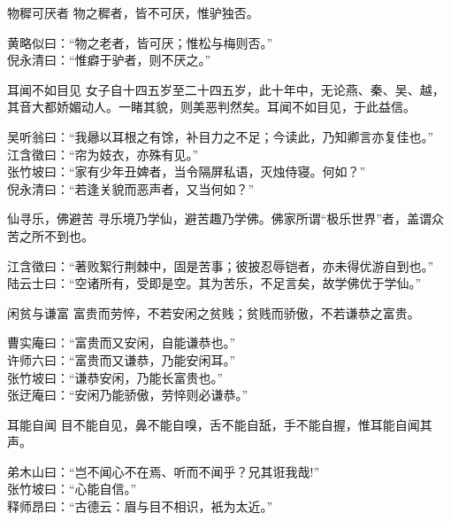 \begin{yulu}{物穉可厌者}
物之穉者，皆不可厌，惟驴独否。
\begin{comments}
黄略似曰：“物之老者，皆可厌；惟松与梅则否。” \\
倪永清曰：“惟癖于驴者，则不厌之。”
\end{comments}
\end{yulu}

\begin{yulu}{耳闻不如目见}
女子自十四五岁至二十四五岁，此十年中，无论燕、秦、吴、越，其音大都娇媚动人。一睹其貌，则美恶判然矣。耳闻不如目见，于此益信。
\begin{comments}
吴听翁曰：“我曏以耳根之有馀，补目力之不足；今读此，乃知卿言亦复佳也。” \\
江含徵曰：“帘为妓衣，亦殊有见。” \\
张竹坡曰：“家有少年丑婢者，当令隔屏私语，灭烛侍寝。何如？” \\
倪永清曰：“若逢关貌而恶声者，又当何如？”
\end{comments}
\end{yulu}

\begin{yulu}{仙寻乐，佛避苦}
寻乐境乃学仙，避苦趣乃学佛。佛家所谓“极乐世界”者，盖谓众苦之所不到也。
\begin{comments}
江含徵曰：“著败絮行荆棘中，固是苦事；彼披忍辱铠者，亦未得优游自到也。” \\
陆云士曰：“空诸所有，受即是空。其为苦乐，不足言矣，故学佛优于学仙。”
\end{comments}
\end{yulu}

\begin{yulu}{闲贫与谦富}
富贵而劳悴，不若安闲之贫贱；贫贱而骄傲，不若谦恭之富贵。
\begin{comments}
曹实庵曰：“富贵而又安闲，自能谦恭也。” \\
许师六曰：“富贵而又谦恭，乃能安闲耳。” \\
张竹坡曰：“谦恭安闲，乃能长富贵也。” \\
张迂庵曰：“安闲乃能骄傲，劳悴则必谦恭。”
\end{comments}
\end{yulu}

\begin{yulu}{耳能自闻}
目不能自见，鼻不能自嗅，舌不能自舐，手不能自握，惟耳能自闻其声。
\begin{comments}
弟木山曰：“岂不闻心不在焉、听而不闻乎？兄其诳我哉!” \\
张竹坡曰：“心能自信。” \\
释师昂曰：“古德云：眉与目不相识，衹为太近。”
\end{comments}
\end{yulu}


